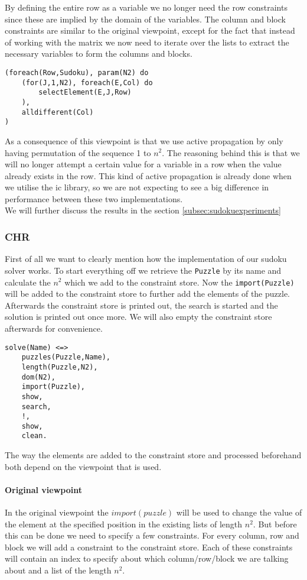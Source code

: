 By defining the entire row as a variable we no longer need the row constraints since these are implied by the domain of the variables.
The column and block constraints are similar to the original viewpoint, except for the fact that instead of working with the matrix we now need to iterate over the lists to extract the necessary variables to form the columns and blocks.

\begin{lstlisting}
(foreach(Row,Sudoku), param(N2) do
	(for(J,1,N2), foreach(E,Col) do
		selectElement(E,J,Row)
	),
	alldifferent(Col)
)
\end{lstlisting}

As a consequence of this viewpoint is that we use active propagation by only having permutation of the sequence 1 to $n^2$.
The reasoning behind this is that we will no longer attempt a certain value for a variable in a row when the value already exists in the row. 
This kind of active propagation is already done when we utilise the ic library, so we are not expecting to see a big difference in performance between these two implementations.\\

We will further discuss the results in the section \ref{subsec:sudokuexperiments}

\subsubsection{CHR}
First of all we want to clearly mention how the implementation of our sudoku solver works.
To start everything off we retrieve the \texttt{Puzzle} by its name and calculate the $n^2$ which we add to the constraint store.
Now the \texttt{import(Puzzle)} will be added to the constraint store to further add the elements of the puzzle.
Afterwards the constraint store is printed out, the search is started and the solution is printed out once more. 
We will also empty the constraint store afterwards for convenience.

\begin{lstlisting}
solve(Name) <=>
	puzzles(Puzzle,Name),
	length(Puzzle,N2),
	dom(N2),
	import(Puzzle),
	show,
	search,
	!,
	show,
	clean.
\end{lstlisting}

The way the elements are added to the constraint store and processed beforehand both depend on the viewpoint that is used.

\paragraph*{Original viewpoint}
In the original viewpoint the \texttt{$import(puzzle)$} will be used to change the value of the element at the specified position in the existing lists of length $n^{2}$. 
But before this can be done we need to specify a few constraints.
For every column, row and block we will add a constraint to the constraint store.
Each of these constraints will contain an index to specify about which column/row/block we are talking about and a list of the length $n^2$.\\

